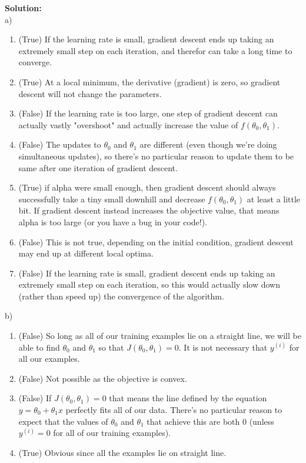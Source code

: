 \documentclass[12pt]{article}
\begin{document}
	\begin{framed}
		\textbf{Solution:}\\
		a)
		\begin{enumerate}
			\item (True) If the learning rate is small, gradient descent ends up taking an extremely small step on each iteration, and therefor can take a long time to converge.
			\item (True) At a local minimum, the derivative (gradient) is zero, so gradient descent will not change the parameters.
			\item (False) If the learning rate is too large, one step of gradient descent can actually vastly "overshoot" and actually increase the value of $f(\theta_0,\theta_1)$.
			\item (False) The updates to $\theta_0$ and $\theta_1$ are different (even though we're doing simultaneous updates), so there's no particular reason to update them to be same after one iteration of gradient descent.
			\item (True) if alpha were small enough, then gradient descent should always successfully take a tiny small downhill and decrease $f(\theta_0,\theta_1)$ at least a little bit. If gradient descent instead increases the objective value, that means alpha is too large (or you have a bug in your code!).
			\item (False) This is not true, depending on the initial condition, gradient descent may end up at different local optima.
			\item (False) If the learning rate is small, gradient descent ends up taking an extremely small step on each iteration, so this would actually slow down (rather than speed up) the convergence of the algorithm.
		\end{enumerate}
		
		b)
		\begin{enumerate}
			\item (False) So long as all of our training examples lie on a straight line, we will be able to find $\theta_0$ and $\theta_1$ so that $J(\theta_0,\theta_1)=0$. It is not necessary that $y^{(i)}$ for all our examples.
			\item (False) Not possible as the objective is convex.
			\item (False) If $J(\theta_0,\theta_1)=0$ that means the line defined by the equation $y = \theta_0 + \theta_1x$ perfectly fits all of our data. There's no particular reason to expect that the values of $\theta_0$ and $\theta_1$ that achieve this are both 0 (unless $y^{(i)}=0$ for all of our training examples).
			\item (True) Obvious since all the examples lie on straight line.
		\end{enumerate} 
	\end{framed}
	
\end{document}
